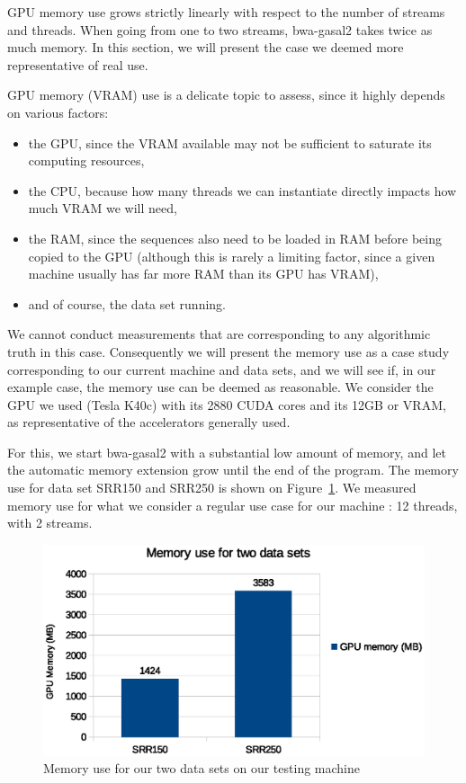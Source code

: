 GPU memory use grows strictly linearly with respect to the number of streams and threads. When going from one to two streams, bwa-gasal2 takes twice as much memory. In this section, we will present the case we deemed more representative of real use.

GPU memory (VRAM) use is a delicate topic to assess, since it highly depends on various factors:

\begin{itemize}
	\item the GPU, since the VRAM available may not be sufficient to saturate its computing resources,
	\item the CPU, because how many threads we can instantiate directly impacts how much VRAM we will need,
	\item the RAM, since the sequences also need to be loaded in RAM before being copied to the GPU (although this is rarely a limiting factor, since a given machine usually has far more RAM than its GPU has VRAM),
	\item and of course, the data set running.
\end{itemize}

We cannot conduct measurements that are corresponding to any algorithmic truth in this case. Consequently we will present the memory use as a case study corresponding to our current machine and data sets, and we will see if, in our example case, the memory use can be deemed as reasonable. We consider the GPU we used (Tesla K40c) with its 2880 CUDA cores and its 12GB or VRAM, as representative of the accelerators generally used.

For this, we start bwa-gasal2 with a substantial low amount of memory, and let the automatic memory extension grow until the end of the program. The memory use for data set SRR150 and SRR250 is shown on Figure~\ref{fig:memory-use}. We measured memory use for what we consider a regular use case for our machine : 12 threads, with 2 streams. 

\begin{figure}[h]
	\centering
	\includegraphics[width=0.9\linewidth]{memory-use}
	\caption{Memory use for our two data sets on our testing machine}
	\label{fig:memory-use}
\end{figure}

